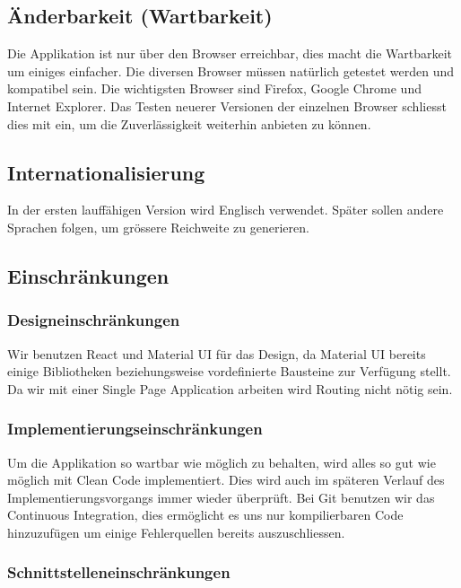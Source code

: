 \documentclass[11pt,ngerman]{article}
\begin{document}
    \subsection{Änderbarkeit (Wartbarkeit)}
	Die Applikation ist nur über den Browser erreichbar, dies macht die Wartbarkeit um einiges einfacher. Die diversen Browser müssen natürlich getestet werden und kompatibel sein. Die wichtigsten Browser sind Firefox, Google Chrome und Internet Explorer.  Das Testen neuerer Versionen der einzelnen Browser schliesst dies mit ein, um die Zuverlässigkeit weiterhin anbieten zu können.
    \subsection{Internationalisierung}
    In der ersten lauffähigen Version wird Englisch verwendet. Später sollen andere Sprachen folgen, um grössere Reichweite zu generieren.
    \subsection{Einschränkungen}

    \subsubsection{Designeinschränkungen}
	Wir benutzen React und Material UI für das Design, da Material UI bereits einige Bibliotheken beziehungsweise vordefinierte  Bausteine zur Verfügung stellt. Da wir mit einer Single Page Application arbeiten wird Routing nicht nötig sein.
    \subsubsection{Implementierungseinschränkungen}
	Um die Applikation so wartbar wie möglich zu behalten, wird alles so gut wie möglich mit Clean Code implementiert. Dies wird auch im späteren Verlauf des Implementierungsvorgangs immer wieder überprüft. Bei Git benutzen wir das Continuous Integration, dies ermöglicht es uns nur kompilierbaren Code hinzuzufügen um einige Fehlerquellen bereits auszuschliessen.
    \subsubsection{Schnittstelleneinschränkungen}
\end{document}
